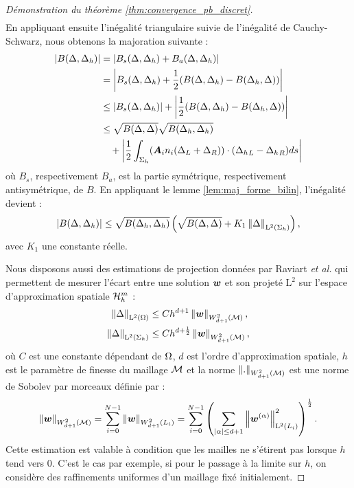 \begin{proof}[Démonstration du théorème \ref{thm:convergence_pb_discret}]
\begin{equation}
\begin{aligned}
		\end{aligned}
	\end{equation}
	En appliquant ensuite l'inégalité triangulaire suivie de l'inégalité de Cauchy-Schwarz,
	nous obtenons la majoration suivante :
	\begin{equation}
		\begin{aligned}
			\left\vert B(\Delta,\Delta_h)\right\vert
			&= \left\vert B_s(\Delta,\Delta_h) + B_a(\Delta,\Delta_h)\right\vert \\
			&= \left\vert B_s(\Delta,\Delta_h)
				+ \frac{1}{2} (B(\Delta,\Delta_h) - B(\Delta_h,\Delta))\right\vert \\
			&\le \left\vert B_s(\Delta,\Delta_h)\right\vert
				+ \left\vert\frac{1}{2} (B(\Delta,\Delta_h) - B(\Delta_h,\Delta))\right\vert \\
			&\le \sqrt{B(\Delta,\Delta)} \sqrt{B(\Delta_h,\Delta_h)} \\
			&\quad + \left\vert\frac{1}{2} \int_{\Sigma_h}
				({\bm{A}_{i}n_{i}} (\Delta_L + \Delta_R))
				\cdot ({\Delta_h}_L - {\Delta_h}_R) ds\right\vert
		\end{aligned}
	\end{equation}
	où $B_s$, respectivement $B_a$, est la partie symétrique,
	respectivement antisymétrique, de $B$.
	En appliquant le lemme \ref{lem:maj_forme_bilin}, l'inégalité devient :
	\begin{align}
		\left\vert B(\Delta,\Delta_h)\right\vert
		\le \sqrt{B(\Delta_h,\Delta_h)} 
		\left( \sqrt{B(\Delta,\Delta)} 
		+ K_1 \left\Vert\Delta\right\Vert_{\mathrm{L}^2(\Sigma_h)} \right) ,
	\end{align}
	avec $K_1$ une constante réelle.

	Nous disposons aussi des estimations de projection
	données par Raviart \textit{et al.} \cite{Raviart1977}
	qui permettent de mesurer l’écart entre une solution $\bm{w}$ et son projeté
	$\mathrm{L}^2$ sur l’espace d’approximation spatiale $\mathcal{H}_h^m$ :
	\begin{subequations}
		\begin{align}
			\left\Vert\Delta\right\Vert_{\mathrm{L}^2(\Omega)} &\le 
			C h^{d + 1} \left\Vert\bm{w}\right\Vert_{W_{d + 1}^{2}(\mathcal{M})} ,
			\\ 
			\left\Vert\Delta\right\Vert_{\mathrm{L}^2(\Sigma_h)} &\le 
			C h^{d + \frac{1}{2}} \left\Vert\bm{w}\right\Vert_{W_{d + 1}^{2}(\mathcal{M})} ,
		\end{align}
	\end{subequations}
	où $C$ est une constante dépendant de $\Omega$,
	$d$ est l'ordre d'approximation spatiale, $h$ est le
	paramètre de finesse du maillage $\mathcal{M}$ et la norme
	$\left\Vert.\right\Vert_{W_{d + 1}^{2}(\mathcal{M})}$ est une norme de Sobolev par morceaux
	définie par :
	\begin{align}
		\left\Vert\bm{w}\right\Vert_{W_{d + 1}^{2}(\mathcal{M})} =
		\sum_{i = 0}^{N - 1} \left\Vert\bm{w}\right\Vert_{W_{d + 1}^{2}(L_i)} =
		\sum_{i = 0}^{N - 1} 
		\left( \sum_{\left\vert\alpha\right\vert \le d + 1}
		\left\Vert\bm{w}^{(\alpha)}\right\Vert_{\mathrm{L}^2(L_i)}^2
		\right)^\frac{1}{2} .
	\end{align}
	Cette estimation est valable à condition que les mailles
	ne s’étirent pas lorsque $h$ tend vers $0$.
	C’est le cas par exemple, si pour le passage à la limite sur $h$,
	on considère des raffinements uniformes d’un maillage fixé initialement.
	

\end{proof}
